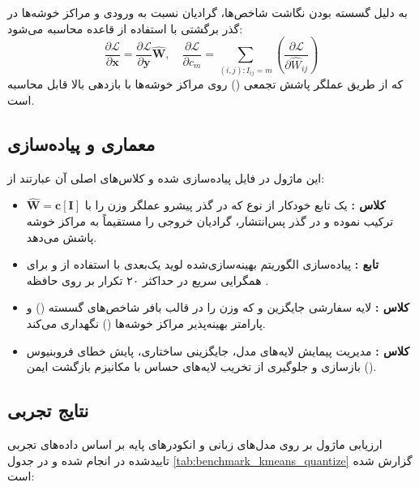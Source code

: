 به دلیل گسسته بودن نگاشت شاخص‌ها، گرادیان نسبت به ورودی و مراکز خوشه‌ها در گذر برگشتی با استفاده از قاعده  محاسبه می‌شود:
\begin{equation}
\frac{\partial \mathcal{L}}{\partial \mathbf{x}} = \frac{\partial \mathcal{L}}{\partial \mathbf{y}} \mathbf{\hat{W}}, \quad \frac{\partial \mathcal{L}}{\partial c_m} = \sum_{(i, j): I_{ij} = m} \left( \frac{\partial \mathcal{L}}{\partial \hat{W}_{ij}} \right)
\end{equation}
که از طریق عملگر پاشش تجمعی () روی مراکز خوشه‌ها با بازدهی بالا قابل محاسبه است.

\subsection{معماری و پیاده‌سازی}
این ماژول در فایل  پیاده‌سازی شده و کلاس‌های اصلی آن عبارتند از:
\begin{itemize}
    \item \textbf{کلاس :} یک تابع خودکار از نوع  که در گذر پیشرو عملگر وزن را با $\mathbf{\hat{W}} = \mathbf{c}[\mathbf{I}]$ ترکیب نموده و در گذر پس‌انتشار، گرادیان خروجی را مستقیماً به مراکز خوشه پاشش می‌دهد.
    \item \textbf{تابع :} پیاده‌سازی الگوریتم بهینه‌سازی‌شده لوید یک‌بعدی با استفاده از  و  برای همگرایی سریع در حداکثر ۲۰ تکرار بر روی حافظه .
    \item \textbf{کلاس :} لایه سفارشی جایگزین  و  که وزن را در قالب بافر شاخص‌های گسسته () و پارامتر بهینه‌پذیر مراکز خوشه‌ها () نگهداری می‌کند.
    \item \textbf{کلاس :} مدیریت پیمایش لایه‌های مدل، جایگزینی ساختاری، پایش خطای فروبنیوس بازسازی و جلوگیری از تخریب لایه‌های حساس با مکانیزم بازگشت ایمن ().
\end{itemize}

\subsection{نتایج تجربی}
ارزیابی ماژول  بر روی مدل‌های زبانی و انکودرهای پایه بر اساس داده‌های تجربی تاییدشده در  انجام شده و در جدول \ref{tab:benchmark_kmeans_quantize} گزارش شده است:

